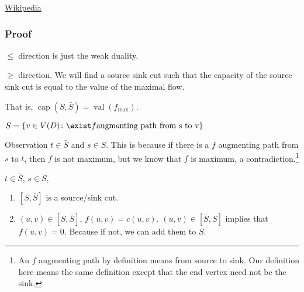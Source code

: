\documentclass[11pt]{article}
\def\max{\operatorname{max}}
\def\val{\operatorname{val}}
\begin{document}
\href{https://en.wikipedia.org/wiki/Ford\%E2\%80\%93Fulkerson\_algorithm}{Wikipedia}
\subsubsection{Proof}
\label{sec:org34a337d}
\(\le\) direction is just the weak duality.

\(\ge\) direction. We will find a source sink cut such that the capacity of
the source sink cut is equal to the value of the maximal flow.

That is, \(\operatorname{cap}(S, \bar{S}) = \val(f_\max)\).

\(S = \{v \in V(D) \colon \exist f \textup{augmenting path from s to v}\}\)

Observation \(t \in \bar{S}\) and \(s \in S\). This is because if there is a \(f\)
augmenting path from \(s\) to \(t\), then \(f\) is not maximum, but we know that
\(f\) is maximum, a contradiction.\footnote{An \(f\) augmenting path by definition means from source to sink. Our
definition here means the same definition except that the end vertex need not be
the sink.}

\(t\in \bar{S}\), \(s\in S\),
\begin{enumerate}
\item \([S, \bar{S}]\) is a source/sink cut.
\item \((u, v) \in [S, \bar{S}]\), \(f(u,v) = c(u, v)\). \((u, v) \in [\bar{S}, S]\)
implies that \(f(u, v) = 0\). Because if not, we can add them to \(S\).
\end{enumerate}
\end{document}
